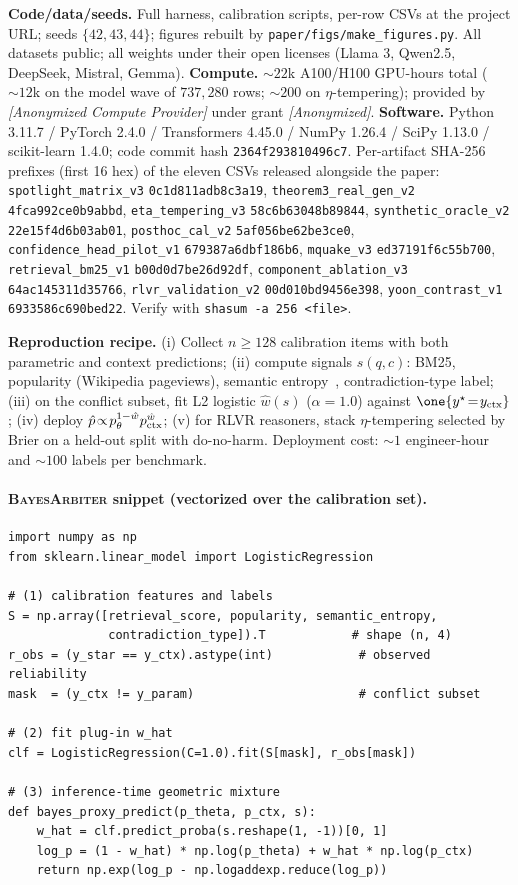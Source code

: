 \textbf{Code/data/seeds.}  Full harness, calibration scripts, per-row
CSVs at the project URL; seeds $\{42,43,44\}$; figures rebuilt by
\texttt{paper/figs/make\_figures.py}.  All datasets public; all weights
under their open licenses (Llama 3, Qwen2.5, DeepSeek, Mistral, Gemma).
\textbf{Compute.}  $\sim\!22$k A100/H100 GPU-hours total ($\sim\!12$k
on the model wave of $737{,}280$ rows; $\sim\!200$ on $\eta$-tempering);
provided by \textit{[Anonymized Compute Provider]} under grant
\textit{[Anonymized]}.
\textbf{Software.}  Python 3.11.7 / PyTorch 2.4.0 / Transformers 4.45.0
/ NumPy 1.26.4 / SciPy 1.13.0 / scikit-learn 1.4.0; code commit hash
\texttt{2364f293810496c7}.  Per-artifact SHA-256 prefixes
(first 16 hex) of the eleven CSVs released alongside the paper:
\texttt{spotlight\_matrix\_v3} \texttt{0c1d811adb8c3a19},
\texttt{theorem3\_real\_gen\_v2} \texttt{4fca992ce0b9abbd},
\texttt{eta\_tempering\_v3} \texttt{58c6b63048b89844},
\texttt{synthetic\_oracle\_v2} \texttt{22e15f4d6b03ab01},
\texttt{posthoc\_cal\_v2} \texttt{5af056be62be3ce0},
\texttt{confidence\_head\_pilot\_v1} \texttt{679387a6dbf186b6},
\texttt{mquake\_v3} \texttt{ed37191f6c55b700},
\texttt{retrieval\_bm25\_v1} \texttt{b00d0d7be26d92df},
\texttt{component\_ablation\_v3} \texttt{64ac145311d35766},
\texttt{rlvr\_validation\_v2} \texttt{00d010bd9456e398},
\texttt{yoon\_contrast\_v1} \texttt{6933586c690bed22}.
Verify with \texttt{shasum -a 256 <file>}.

\textbf{Reproduction recipe.}  (i) Collect $n\!\geq\!128$ calibration
items with both parametric and context predictions; (ii) compute
signals $s(q,c)$: BM25, popularity (Wikipedia pageviews), semantic
entropy~\citep{kuhn2023semantic}, contradiction-type label;
(iii) on the conflict subset, fit L2 logistic
$\hat w(s)$ ($\alpha\!=\!1.0$) against $\one{y^\star\!=\!y_\ctx}$;
(iv) deploy $\hat p\!\propto\!p_\theta^{1-\hat w}p_{\mathrm{ctx}}^{\hat w}$;
(v) for RLVR reasoners, stack $\eta$-tempering selected by Brier on a
held-out split with do-no-harm.
Deployment cost: $\sim\!1$ engineer-hour and $\sim\!100$ labels per
benchmark.

\paragraph{\textsc{BayesArbiter} snippet (vectorized over the calibration set).}
\begin{verbatim}
import numpy as np
from sklearn.linear_model import LogisticRegression

# (1) calibration features and labels
S = np.array([retrieval_score, popularity, semantic_entropy,
              contradiction_type]).T            # shape (n, 4)
r_obs = (y_star == y_ctx).astype(int)            # observed reliability
mask  = (y_ctx != y_param)                       # conflict subset

# (2) fit plug-in w_hat
clf = LogisticRegression(C=1.0).fit(S[mask], r_obs[mask])

# (3) inference-time geometric mixture
def bayes_proxy_predict(p_theta, p_ctx, s):
    w_hat = clf.predict_proba(s.reshape(1, -1))[0, 1]
    log_p = (1 - w_hat) * np.log(p_theta) + w_hat * np.log(p_ctx)
    return np.exp(log_p - np.logaddexp.reduce(log_p))
\end{verbatim}

